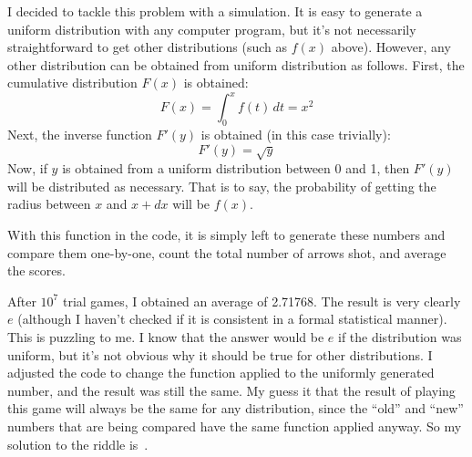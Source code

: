 \documentclass{article}
\begin{document}
I decided to tackle this problem with a simulation.
It is easy to generate a uniform distribution with any computer program, but it's not necessarily straightforward to get other distributions (such as $f(x)$ above).
However, any other distribution can be obtained from uniform distribution as follows.
First, the cumulative distribution $F(x)$ is obtained:
\[
F(x)=\int_{0}^{x}f(t)\,dt=x^{2}
\]
Next, the inverse function $F'(y)$ is obtained (in this case trivially):
\[
F'(y)=\sqrt{y}
\]
Now, if $y$ is obtained from a uniform distribution between 0 and 1, then $F'(y)$ will be distributed as necessary.
That is to say, the probability of getting the radius between $x$ and $x+dx$ will be $f(x)$.

With this function in the code, it is simply left to generate these numbers and compare them one-by-one, count the total number of arrows shot, and average the scores.

After $10^{7}$ trial games, I obtained an average of 2.71768.
The result is very clearly $e$ (although I haven't checked if it is consistent in a formal statistical manner).
This is puzzling to me.
I know that the answer would be $e$ if the distribution was uniform, but it's not obvious why it should be true for other distributions.
I adjusted the code to change the function applied to the uniformly generated number, and the result was still the same.
My guess it that the result of playing this game will always be the same for any distribution, since the ``old'' and ``new'' numbers that are being compared have the same function applied anyway.
So my solution to the riddle is
\,.
\end{document}
